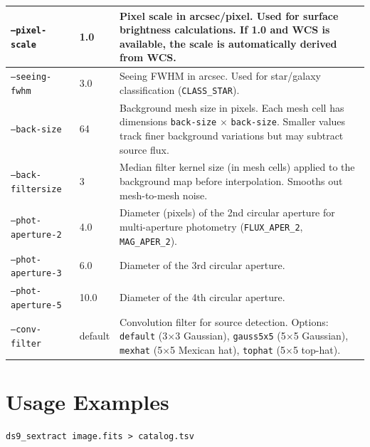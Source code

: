 \documentclass[11pt,fleqn]{book}
\begin{document}
\begin{center}
\begin{longtable}{L{4.0cm} C{1.5cm} L{7.0cm}}
\texttt{--pixel-scale} & 1.0 & Pixel scale in arcsec/pixel. Used for surface brightness calculations. If 1.0 and WCS is available, the scale is automatically derived from WCS. \\
\midrule

\texttt{--seeing-fwhm} & 3.0 & Seeing FWHM in arcsec. Used for star/galaxy classification (\texttt{CLASS\_STAR}). \\
\midrule

\texttt{--back-size} & 64 & Background mesh size in pixels. Each mesh cell has dimensions \texttt{back-size} $\times$ \texttt{back-size}. Smaller values track finer background variations but may subtract source flux. \\
\midrule

\texttt{--back-filtersize} & 3 & Median filter kernel size (in mesh cells) applied to the background map before interpolation. Smooths out mesh-to-mesh noise. \\
\midrule

\texttt{--phot-aperture-2} & 4.0 & Diameter (pixels) of the 2nd circular aperture for multi-aperture photometry (\texttt{FLUX\_APER\_2}, \texttt{MAG\_APER\_2}). \\
\midrule

\texttt{--phot-aperture-3} & 6.0 & Diameter of the 3rd circular aperture. \\
\midrule

\texttt{--phot-aperture-5} & 10.0 & Diameter of the 4th circular aperture. \\
\midrule

\texttt{--conv-filter} & default & Convolution filter for source detection. Options: \texttt{default} (3$\times$3 Gaussian), \texttt{gauss5x5} (5$\times$5 Gaussian), \texttt{mexhat} (5$\times$5 Mexican hat), \texttt{tophat} (5$\times$5 top-hat). \\

\bottomrule
\end{longtable}
\end{center}


\section{Usage Examples}

\begin{codebox}
\begin{lstlisting}[style=bash,numbers=none]
ds9_sextract image.fits > catalog.tsv
\end{lstlisting}
\end{codebox}
\end{document}
